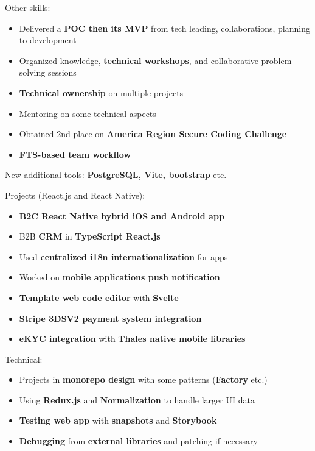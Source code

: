 \documentclass[10pt,a4paper,ragged2e,withhyper]{altacv}
\begin{document}
\medskip
Other skills:
\begin{itemize}
  \item Delivered a \textbf{POC then its MVP} from tech leading, collaborations, planning to development
  \item Organized knowledge, \textbf{technical workshops}, and collaborative problem-solving sessions
  \item \textbf{Technical ownership} on multiple projects
  \item Mentoring on some technical aspects
  \item Obtained 2nd place on \textbf{America Region Secure Coding Challenge}
  \item \textbf{FTS-based team workflow}
\end{itemize}
\begin{itshape}
  \underline{New additional tools:}
  \small{\textbf{PostgreSQL, Vite, bootstrap} etc.}
\end{itshape}

\divider

\vspace{-.5\baselineskip}
\begin{minipage}[t]{0.45\textwidth}
  \vspace{0pt}
  Projects (React.js and React Native):
  \begin{itemize}
    \item \textbf{B2C React Native hybrid iOS and Android app}
    \item B2B \textbf{CRM} in \textbf{TypeScript React.js}
    \item Used \textbf{centralized i18n internationalization} for apps
    \item Worked on \textbf{mobile applications push notification}
    \item \textbf{Template web code editor} with \textbf{Svelte}
    \item \textbf{Stripe 3DSV2 payment system integration}
    \item \textbf{eKYC integration} with \textbf{Thales native mobile libraries}
  \end{itemize}
\end{minipage}
\hfill
\begin{minipage}[t]{0.45\textwidth}
  \vspace{0pt}
  Technical:
  \begin{itemize}
    \item Projects in \textbf{monorepo design} with some patterns (\textbf{Factory} etc.)
    \item Using \textbf{Redux.js} and \textbf{Normalization} to handle larger UI data
    \item \textbf{Testing web app} with \textbf{snapshots} and \textbf{Storybook}
    \item \textbf{Debugging} from \textbf{external libraries} and patching if necessary
  \end{itemize}
\end{minipage}
\end{document}
